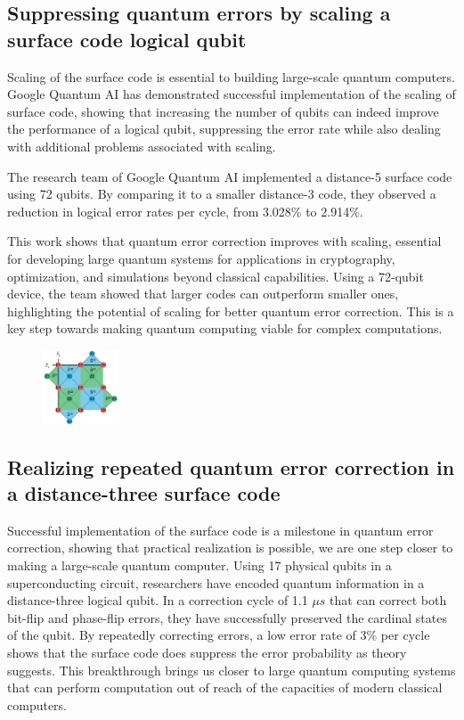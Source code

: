 \subsection{Suppressing quantum errors by scaling a surface code logical qubit}

Scaling of the surface code is essential to building large-scale quantum computers. Google Quantum AI has demonstrated successful implementation of the scaling of surface code, showing that increasing the number of qubits can indeed improve the performance of a logical qubit, suppressing the error rate while also dealing with additional problems associated with scaling.

The research team of Google Quantum AI implemented a distance-5 surface code using 72 qubits. By comparing it to a smaller distance-3 code, they observed a reduction in logical error rates per cycle, from 3.028\% to 2.914\%.

This work shows that quantum error correction improves with scaling, essential for developing large quantum systems for applications in cryptography, optimization, and simulations beyond classical capabilities. Using a 72-qubit device, the team showed that larger codes can outperform smaller ones, highlighting the potential of scaling for better quantum error correction. This is a key step towards making quantum computing viable for complex computations.

\begin{figure}[h]
    \centering
    \includegraphics[width=0.2\textwidth]{sections/5_practical_implementation/representation.png}
    \caption{}
\end{figure}

\subsection{Realizing repeated quantum error correction in a distance-three surface code}
Successful implementation of the surface code is a milestone in quantum error correction, showing that practical realization is possible, we are one step closer to making a large-scale quantum computer. Using 17 physical qubits in a superconducting circuit, researchers have encoded quantum information in a distance-three logical qubit. In a correction cycle of 1.1 $\mu s$ that can correct both bit-flip and phase-flip errors, they have successfully preserved the cardinal states of the qubit. By repeatedly correcting errors, a low error rate of 3\% per cycle shows that the surface code does suppress the error probability as theory suggests. This breakthrough brings us closer to large quantum computing systems that can perform computation out of reach of the capacities of modern classical computers.

